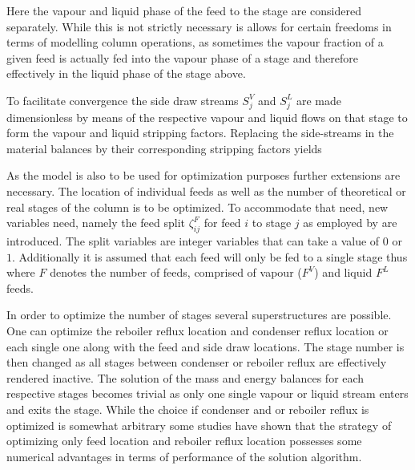         Here the vapour and liquid phase of the feed to the stage are considered separately.
        While this is not strictly necessary is allows for certain freedoms in terms of modelling
        column operations, as sometimes the vapour fraction of a given feed is actually fed into
        the vapour phase of a stage and therefore effectively in the liquid phase of the stage above.

        To facilitate convergence the side draw streams $S_j^V$ and $S_j^L$ are made dimensionless
        by means of the respective vapour and liquid flows on that stage to form the
        vapour
        and liquid
        stripping factors. Replacing the side-streams in the material balances by their
        corresponding stripping factors yields

        As the model is also to be used for optimization purposes further extensions are necessary.
        The location of individual feeds as well as the number of theoretical or real stages of the
        column is to be optimized. To accommodate that need, new variables need, namely the feed
        split $\zeta_{ij}^F$ for feed $i$ to stage $j$ as employed by \cite{Dunnebier.1999} are introduced.
        The split variables are integer variables that can take a value of $0$ or $1$. Additionally it is
        assumed that each feed will only be fed to a single stage thus
        where $F$ denotes the number of feeds, comprised of vapour ($F^V$) and liquid $F^L$ feeds.

        In order to optimize the number of stages several superstructures are possible. One can
        optimize the reboiler reflux location and condenser reflux location or each single one
        along with the feed and side draw locations. The stage number is then changed as all stages
        between condenser or reboiler reflux are effectively rendered inactive. The solution of
        the mass and energy balances for each respective stages becomes trivial as only one single
        vapour or liquid stream enters and exits the stage. While the choice if condenser and or reboiler
        reflux is optimized is somewhat arbitrary some studies have shown \cite{Grossmann.2005} that
        the strategy of optimizing only feed location and reboiler reflux location possesses some
        numerical advantages in terms of performance of the solution algorithm.

